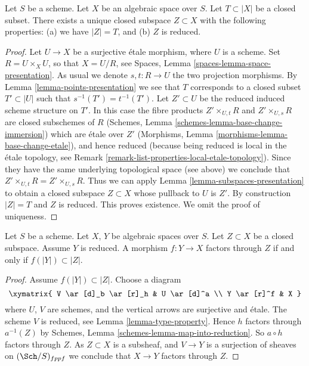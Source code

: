 \begin{lemma}
\label{lemma-reduced-closed-subspace}
Let $S$ be a scheme.
Let $X$ be an algebraic space over $S$.
Let $T \subset |X|$ be a closed subset.
There exists a unique closed subspace $Z \subset X$ with
the following properties: (a) we have $|Z| = T$, and (b) $Z$ is reduced.
\end{lemma}

\begin{proof}
Let $U \to X$ be a surjective \'etale morphism, where $U$ is a scheme.
Set $R = U \times_X U$, so that $X = U/R$, see
Spaces, Lemma \ref{spaces-lemma-space-presentation}.
As usual we denote $s, t : R \to U$ the two projection morphisms.
By Lemma \ref{lemma-points-presentation}
we see that $T$ corresponds to a closed subset $T' \subset |U|$ such
that $s^{-1}(T') = t^{-1}(T')$.
Let $Z' \subset U$ be the reduced induced scheme structure on $T'$.
In this case the fibre products
$Z' \times_{U, t} R$ and $Z' \times_{U, s} R$ are closed subschemes
of $R$
(Schemes, Lemma \ref{schemes-lemma-base-change-immersion})
which are \'etale over $Z'$
(Morphisms, Lemma \ref{morphisms-lemma-base-change-etale}),
and hence reduced
(because being reduced is local in the \'etale topology, see
Remark \ref{remark-list-properties-local-etale-topology}).
Since they have the same underlying topological space (see above)
we conclude that $Z' \times_{U, t} R = Z' \times_{U, s} R$.
Thus we can apply Lemma \ref{lemma-subspaces-presentation}
to obtain a closed subspace $Z \subset X$ whose pullback to $U$ is $Z'$.
By construction $|Z| = T$ and $Z$ is reduced. This proves existence.
We omit the proof of uniqueness.
\end{proof}

\begin{lemma}
\label{lemma-map-into-reduction}
Let $S$ be a scheme.
Let $X$, $Y$ be algebraic spaces over $S$.
Let $Z \subset X$ be a closed subspace.
Assume $Y$ is reduced.
A morphism $f : Y \to X$ factors through $Z$ if and only if
$f(|Y|) \subset |Z|$.
\end{lemma}

\begin{proof}
Assume $f(|Y|) \subset |Z|$. Choose a diagram
$$
\xymatrix{
V \ar[d]_b \ar[r]_h & U \ar[d]^a \\
Y \ar[r]^f & X
}
$$
where $U$, $V$ are schemes, and the vertical arrows are surjective and
\'etale. The scheme $V$ is reduced, see
Lemma \ref{lemma-type-property}.
Hence $h$ factors through $a^{-1}(Z)$ by
Schemes, Lemma \ref{schemes-lemma-map-into-reduction}.
So $a \circ h$ factors through $Z$.
As $Z \subset X$ is a subsheaf, and $V \to Y$ is a surjection of sheaves
on $(\Sch/S)_{fppf}$ we conclude that $X \to Y$ factors
through $Z$.
\end{proof}

